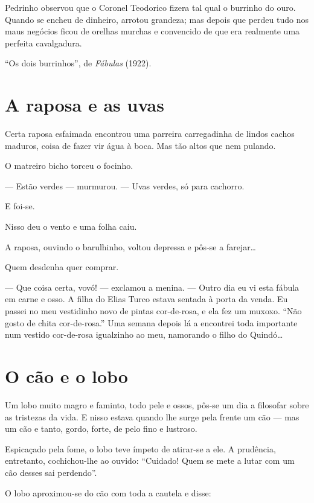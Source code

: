 Pedrinho observou que o Coronel Teodorico fizera tal qual o burrinho do
ouro. Quando se encheu de dinheiro, arrotou grandeza; mas depois que
perdeu tudo nos maus negócios ficou de orelhas murchas e convencido de
que era realmente uma perfeita cavalgadura.

``Os dois burrinhos'', de \textit{Fábulas} (1922).

\chapter{A raposa e as uvas}

Certa raposa esfaimada encontrou uma parreira carregadinha de lindos
cachos maduros, coisa de fazer vir água à boca. Mas tão altos que nem
pulando.

O matreiro bicho torceu o focinho.

--- Estão verdes --- murmurou. --- Uvas verdes, só para cachorro.

E foi-se.

Nisso deu o vento e uma folha caiu.

A raposa, ouvindo o barulhinho, voltou depressa e pôs-se a
farejar\ldots{}

Quem desdenha quer comprar.

--- Que coisa certa, vovó! --- exclamou a menina. --- Outro dia eu vi
esta fábula em carne e osso. A filha do Elias Turco estava sentada à
porta da venda. Eu passei no meu vestidinho novo de pintas cor-de-rosa,
e ela fez um muxoxo. ``Não gosto de chita cor-de-rosa.'' Uma semana
depois lá a encontrei toda importante num vestido cor-de-rosa igualzinho
ao meu, namorando o filho do Quindó\ldots{}


\chapter{O cão e o lobo}

Um lobo muito magro e faminto, todo pele e ossos, pôs-se um dia a
filosofar sobre as tristezas da vida. E nisso estava quando lhe surge
pela frente um cão --- mas um cão e tanto, gordo, forte, de pelo fino e
lustroso.

Espicaçado pela fome, o lobo teve ímpeto de atirar-se a ele. A
prudência, entretanto, cochichou-lhe ao ouvido: ``Cuidado! Quem se mete
a lutar com um cão desses sai perdendo''.

O lobo aproximou-se do cão com toda a cautela e disse:

